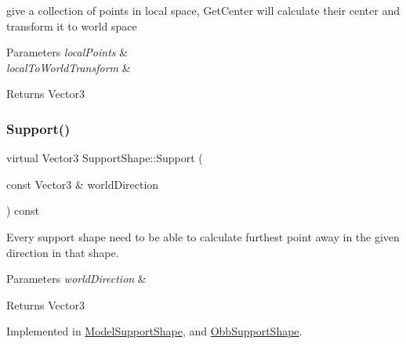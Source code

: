 give a collection of points in local space, Get\+Center will calculate their center and transform it to world space 


\begin{DoxyParams}{Parameters}
{\em local\+Points} & \\
\hline
{\em local\+To\+World\+Transform} & \\
\hline
\end{DoxyParams}
\begin{DoxyReturn}{Returns}
Vector3 
\end{DoxyReturn}
\mbox{\label{classSupportShape_ad6aca93d79a36c7db3a449a4364a2c1e}} 
\subsubsection{\texorpdfstring{Support()}{Support()}\hspace{0.1cm}{\footnotesize\ttfamily [1/2]}}
{\footnotesize\ttfamily virtual Vector3 Support\+Shape\+::\+Support (\begin{DoxyParamCaption}\item[{const Vector3 \&}]{world\+Direction }\end{DoxyParamCaption}) const\hspace{0.3cm}{\ttfamily [pure virtual]}}



Every support shape need to be able to calculate furthest point away in the given direction in that shape. 


\begin{DoxyParams}{Parameters}
{\em world\+Direction} & \\
\hline
\end{DoxyParams}
\begin{DoxyReturn}{Returns}
Vector3 
\end{DoxyReturn}


Implemented in \hyperlink{classModelSupportShape_aa15c689024a0e86594fec5461c67f808}{Model\+Support\+Shape}, and \hyperlink{classObbSupportShape_ae47da1aea42eedb3327bc71aa08a0d65}{Obb\+Support\+Shape}.

\mbox{\label{classSupportShape_a105572c175fd14661261a7d189d409a2}} 
